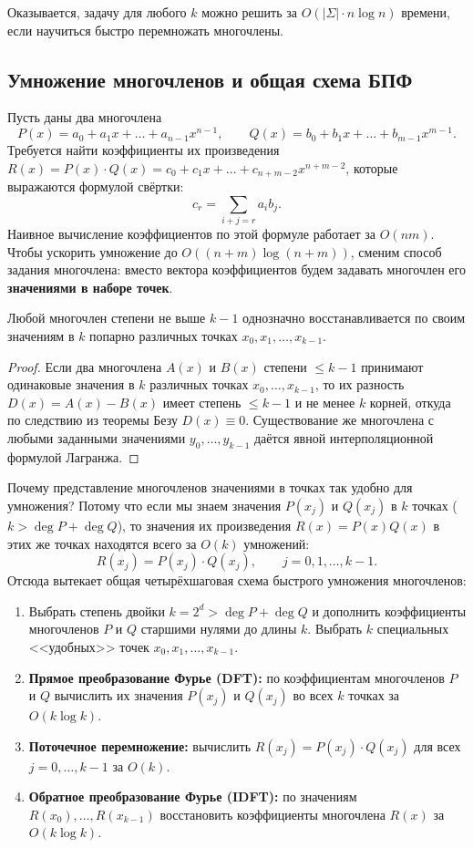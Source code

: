Оказывается, задачу для любого $k$ можно решить за $O(|\Sigma| \cdot n \log n)$ времени, если научиться быстро перемножать многочлены.

\subsection{Умножение многочленов и общая схема БПФ}

Пусть даны два многочлена
\[
    P(x) = a_0 + a_1 x + \dots + a_{n-1} x^{n-1}, \qquad Q(x) = b_0 + b_1 x + \dots + b_{m-1} x^{m-1}.
\]
Требуется найти коэффициенты их произведения $R(x) = P(x) \cdot Q(x) = c_0 + c_1 x + \dots + c_{n+m-2} x^{n+m-2}$, которые выражаются формулой свёртки:
\[
    c_r = \sum_{i + j = r} a_i b_j.
\]
Наивное вычисление коэффициентов по этой формуле работает за $O(nm)$. Чтобы ускорить умножение до $O((n+m) \log(n+m))$, сменим способ задания многочлена: вместо вектора коэффициентов будем задавать многочлен его \textbf{значениями в наборе точек}.

\begin{proposition}
    Любой многочлен степени не выше $k - 1$ однозначно восстанавливается по своим значениям в $k$ попарно различных точках $x_0, x_1, \dots, x_{k-1}$.
\end{proposition}

\begin{proof}
    Если два многочлена $A(x)$ и $B(x)$ степени $\le k - 1$ принимают одинаковые значения в $k$ различных точках $x_0, \dots, x_{k-1}$, то их разность $D(x) = A(x) - B(x)$ имеет степень $\le k - 1$ и не менее $k$ корней, откуда по следствию из теоремы Безу $D(x) \equiv 0$. Существование же многочлена с любыми заданными значениями $y_0, \dots, y_{k-1}$ даётся явной интерполяционной формулой Лагранжа.
\end{proof}

Почему представление многочленов значениями в точках так удобно для умножения? Потому что если мы знаем значения $P(x_j)$ и $Q(x_j)$ в $k$ точках ($k > \deg P + \deg Q$), то значения их произведения $R(x) = P(x) Q(x)$ в этих же точках находятся всего за $O(k)$ умножений:
\[
    R(x_j) = P(x_j) \cdot Q(x_j), \qquad j = 0, 1, \dots, k - 1.
\]
Отсюда вытекает общая четырёхшаговая схема быстрого умножения многочленов:
\begin{enumerate}
    \item Выбрать степень двойки $k = 2^d > \deg P + \deg Q$ и дополнить коэффициенты многочленов $P$ и $Q$ старшими нулями до длины $k$. Выбрать $k$ специальных <<удобных>> точек $x_0, x_1, \dots, x_{k-1}$.
    \item \textbf{Прямое преобразование Фурье (DFT):} по коэффициентам многочленов $P$ и $Q$ вычислить их значения $P(x_j)$ и $Q(x_j)$ во всех $k$ точках за $O(k \log k)$.
    \item \textbf{Поточечное перемножение:} вычислить $R(x_j) = P(x_j) \cdot Q(x_j)$ для всех $j = 0, \dots, k - 1$ за $O(k)$.
    \item \textbf{Обратное преобразование Фурье (IDFT):} по значениям $R(x_0), \dots, R(x_{k-1})$ восстановить коэффициенты многочлена $R(x)$ за $O(k \log k)$.
\end{enumerate}

